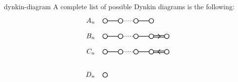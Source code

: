\begin{example}{dynkin-diagram}
    A complete list of possible Dynkin diagrams is the following: 
    \[ \svg \begin{tikzpicture}[scale=.4]
        \begin{scope}
            \draw (-1,0) node[anchor=east] {$A_n$};
            \draw[thick] (0cm,0) circle (.3cm);
            \draw[thick] (2cm,0) circle (.3cm);
            \draw[thick] (4cm,0) circle (.3cm);
            \draw[thick] (6cm,0) circle (.3cm);
            \draw[thick] (0.3cm,0) -- +(1.4 cm,0);
            \draw[thick, dotted] (2.3cm,0) -- +(1.4 cm,0);
            \draw[thick] (4.3cm,0) -- +(1.4 cm,0);
        \end{scope}
        \begin{scope}[yshift=-2.0cm]
            \draw (-1,0) node[anchor=east] {$B_n$};
            \draw[thick] (0cm,0) circle (.3cm);
            \draw[thick] (2cm,0) circle (.3cm);
            \draw[thick] (4cm,0) circle (.3cm);
            \draw[thick] (6cm,0) circle (.3cm);
            \draw[thick] (8cm,0) circle (.3cm);
            \draw[thick] (0.3cm,0) -- +(1.4 cm,0);
            \draw[thick, dotted] (2.3cm,0) -- +(1.4 cm,0);
            \draw[thick] (4.3cm,0) -- +(1.4 cm,0);
            \draw[thick] (6.3cm,0.1cm) -- +(1.4 cm,0cm);
            \draw[thick] (6.3cm,-0.1cm) -- +(1.4 cm,0cm);
            \draw[thick] (6.85cm,0.3cm) -- +(0.3cm,-0.3cm);
            \draw[thick] (6.85cm,-0.3cm) -- +(0.3cm,0.3cm);
        \end{scope}
        \begin{scope}[yshift=-4.0cm]
            \draw (-1,0) node[anchor=east] {$C_n$};
            \draw[thick] (0cm,0) circle (.3cm);
            \draw[thick] (2cm,0) circle (.3cm);
            \draw[thick] (4cm,0) circle (.3cm);
            \draw[thick] (6cm,0) circle (.3cm);
            \draw[thick] (8cm,0) circle (.3cm);
            \draw[thick] (0.3cm,0) -- +(1.4 cm,0);
            \draw[thick, dotted] (2.3cm,0) -- +(1.4 cm,0);
            \draw[thick] (4.3cm,0) -- +(1.4 cm,0);
            \draw[thick] (6.3cm,0.1cm) -- +(1.4 cm,0cm);
            \draw[thick] (6.3cm,-0.1cm) -- +(1.4 cm,0cm);
            \draw[thick] (7.15cm,0.3cm) -- +(-0.3cm,-0.3cm);
            \draw[thick] (7.15cm,-0.3cm) -- +(-0.3cm,0.3cm);
        \end{scope}
        \begin{scope}[yshift=-7.0cm]
            \draw (-1,0) node[anchor=east] {$D_n$};
            \draw[thick] (0cm,0) circle (.3cm);

\end{scope}
\end{tikzpicture}\]
\end{example}
